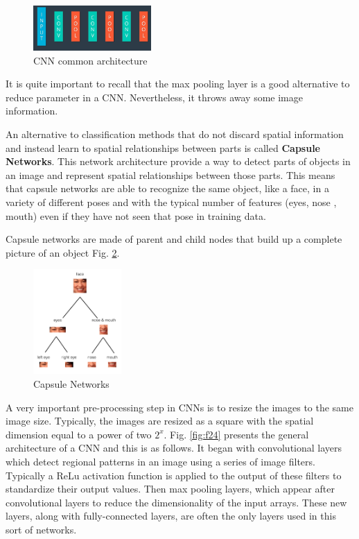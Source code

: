 \documentclass{article}
\begin{document}
\begin{figure}[ht]
    \centering
    \includegraphics[width=0.4\textwidth,height=0.4\textheight,keepaspectratio]{images/architecture.png}
    \captionsetup{justification=centering}
    \caption{CNN common architecture}
    \label{fig:f22}
\end{figure}

It is quite important to recall that the max pooling layer is a good alternative to reduce parameter in a CNN. Nevertheless, it throws away some image information.


An alternative to classification methods that do not discard spatial information and instead learn to spatial relationships between parts is called \textbf{Capsule Networks}. This network architecture provide a way to detect parts of objects in an image and represent spatial relationships between those parts. This means that capsule networks are able to recognize the same object, like a face, in a variety of different poses and with the typical number of features (eyes, nose , mouth) even if they have not seen that pose in training data. 

Capsule networks are made of parent and child nodes that build up a complete picture of an object Fig. \ref{fig:f23}.

\begin{figure}[ht]
    \centering
    \includegraphics[width=0.3\textwidth,height=0.3\textheight,keepaspectratio]{images/faces.png}
    \captionsetup{justification=centering}
    \caption{Capsule Networks}
    \label{fig:f23}
\end{figure}

A very important pre-processing step in CNNs is to resize the images to the same image size. Typically, the images are resized as a square with the spatial dimension equal to a power of two \(2^x\). Fig. \ref{fig:f24} presents the general architecture of a CNN and this is as follows. It began with convolutional layers which detect regional patterns in an image using a series of image filters. Typically a ReLu activation function is applied to the output of these filters to standardize their output values. Then max pooling layers, which appear after convolutional layers to reduce the dimensionality of the input arrays. These new layers, along with fully-connected layers, are often the only layers used in this sort of networks.
\end{document}
